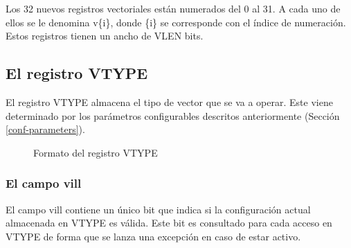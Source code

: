 Los 32 nuevos registros vectoriales están numerados del 0 al 31. A cada uno de
ellos se le denomina v\{i\}, donde \{i\} se corresponde con el índice de
numeración. Estos registros tienen un ancho de VLEN bits.


\subsection{El registro VTYPE}\label{vtype-register}

El registro VTYPE almacena el tipo de vector que se va a operar. Este viene determinado por los parámetros configurables descritos anteriormente (Sección \ref{conf-parameters}).

\begin{figure}[H]
\begin{scaletikzpicturetowidth}{\textwidth}
\end{scaletikzpicturetowidth}
\caption {Formato del registro VTYPE}
\label{fig:vtype-reg-format}
\end{figure}

\subsubsection{El campo vill}
El campo vill contiene un único bit que indica si la configuración actual almacenada en VTYPE es válida. Este bit es consultado para cada acceso en VTYPE de forma que se lanza una excepción en caso de estar activo.

